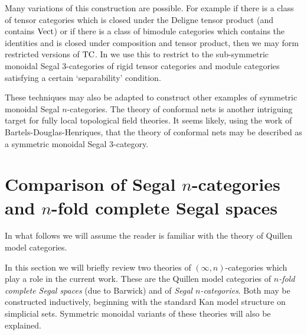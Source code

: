 \documentclass{amsart}
\begin{document}
Many variations of this construction are possible. For example if there is a class of tensor categories which is closed under the Deligne tensor product (and contains $\mathrm{Vect}$) or if there is a class of bimodule categories which contains the identities and is closed under composition and tensor product, then we may form restricted versions of $\mathrm{TC}$. In \cite{DSPS} we use this to restrict to the sub-symmetric monoidal Segal 3-categories of rigid tensor categories and module categories satisfying a certain `separability' condition.  

These techniques may also be adapted to construct other examples of symmetric monoidal Segal $n$-categories. The theory of conformal nets \cite{0912.5307} is another intriguing target for fully local topological field theories. It seems likely, using the work of Bartels-Douglas-Henriques, that the theory of conformal nets may be described as a symmetric monoidal Segal 3-category.  



\appendix


\section{Comparison of Segal $n$-categories and $n$-fold complete Segal spaces} \label{app:compare}




In what follows we will assume the reader is familiar with the theory of Quillen model categories. 

In this section we will briefly review two theories of $(\infty,n)$-categories which play a role in the current work. These are the Quillen model categories of {\em $n$-fold complete Segal spaces} (due to Barwick) and of {\em Segal $n$-categories}. Both may be constructed inductively, beginning with the standard Kan model structure on simplicial sets. Symmetric monoidal variants of these theories will also be explained. 
\end{document}
